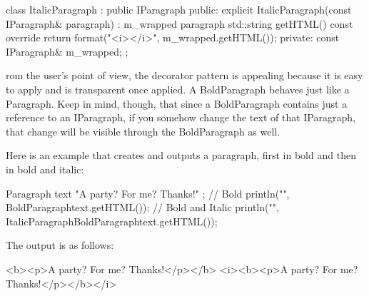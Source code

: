 \begin{cpp}
class ItalicParagraph : public IParagraph
{
    public:
        explicit ItalicParagraph(const IParagraph& paragraph)
        : m_wrapped { paragraph } { }
        std::string getHTML() const override {
            return format("<i>{}</i>", m_wrapped.getHTML()); }
    private:
        const IParagraph& m_wrapped;
};
\end{cpp}


rom the user’s point of view, the decorator pattern is appealing because it is easy to apply and is transparent once applied. A BoldParagraph behaves just like a Paragraph. Keep in mind, though, that since a BoldParagraph contains just a reference to an IParagraph, if you somehow change the text of that IParagraph, that change will be visible through the BoldParagraph as well.

Here is an example that creates and outputs a paragraph, first in bold and then in bold and italic:

\begin{cpp}
Paragraph text { "A party? For me? Thanks!" };
// Bold
println("{}", BoldParagraph{text}.getHTML());
// Bold and Italic
println("{}", ItalicParagraph{BoldParagraph{text}}.getHTML());
\end{cpp}

The output is as follows:

\begin{shell}
<b><p>A party? For me? Thanks!</p></b>
<i><b><p>A party? For me? Thanks!</p></b></i>
\end{shell}
















